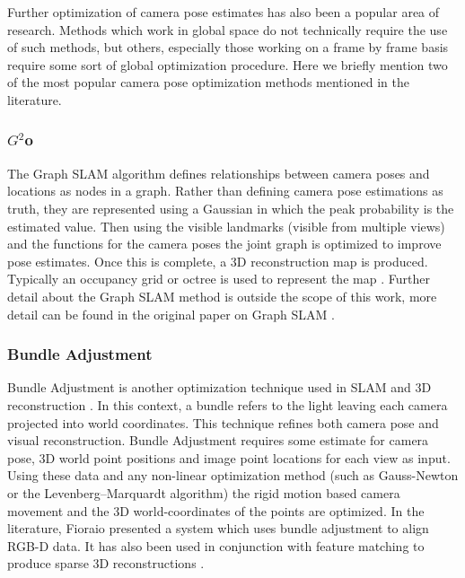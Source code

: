 
Further optimization of camera pose estimates has also been a popular area of research. Methods which work in global space do not technically require the use of such methods, but others, especially those working on a frame by frame basis require some sort of global optimization procedure. Here we briefly mention two of the most popular camera pose optimization methods mentioned in the literature.

\subsubsection{$G^2$o}
\label{Sec:G20}
The Graph SLAM algorithm defines relationships between camera poses and locations as nodes in a graph. Rather than defining camera pose estimations as truth, they are represented using a Gaussian in which the peak probability is the estimated value. Then using the visible landmarks (visible from multiple views) and the functions for the camera poses the joint graph is optimized to improve pose estimates. Once this is complete, a 3D reconstruction map is produced. \\

Typically an occupancy grid or octree is used to represent the map \cite{Wurm10Octomap}. Further detail about the Graph SLAM method is outside the scope of this work, more detail can be found in the original paper on Graph SLAM \cite{Kummerle11G}. \\

\subsubsection{Bundle Adjustment}
\label{sec:ba}
Bundle Adjustment is another optimization technique used in SLAM and 3D reconstruction \cite{Lourakis09Sba}. In this context, a bundle refers to the light leaving each camera projected into world coordinates. This technique refines both camera pose and visual reconstruction. Bundle Adjustment requires some estimate for camera pose, 3D world point positions and image point locations for each view as input. \\

Using these data and any non-linear optimization method (such as Gauss-Newton or the Levenberg–Marquardt algorithm) the rigid motion based camera movement and the 3D world-coordinates of the points are optimized. In the literature, Fioraio \cite{Fioraio11Realtime} presented a system which uses bundle adjustment to align RGB-D data. It has also been used in conjunction with feature matching to produce sparse 3D reconstructions \cite{Klein07Parallel,Agarwal09Building}.
